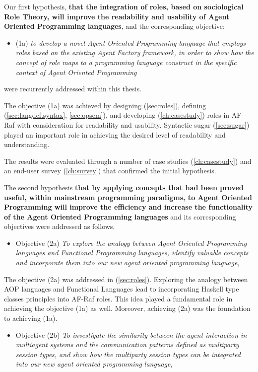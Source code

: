 \documentclass[a4paper,12pt,oneside,fleqn]{book} %
\begin{document}
{Our first hypothesis, \textbf{that the integration of roles, based on
sociological Role Theory, will improve the readability and usability of
Agent Oriented Programming languages}, and the corresponding objective:

\begin{itemize}
  \item (1a) \textit{to develop a novel Agent Oriented Programming language that employs roles based on the existing Agent Factory framework, in order to show how the concept of role maps to a programming language construct in the specific context of Agent Oriented Programming} 
\end{itemize}
were recurrently addressed within this thesis. 

The objective (1a) was achieved by designing (\autoref{sec:roles}),
defining (\autoref{sec:langdef.syntax}, \autoref{sec:opsem}), and
developing (\autoref{ch:casestudy}) roles in AF-Raf with consideration for
readability and usability. Syntactic sugar (\autoref{sec:sugar}) played an
important role in achieving the desired level of readability and
understanding.

The results were evaluated through a number of case
studies (\autoref{ch:casestudy}) and an end-user
survey (\autoref{ch:survey}) that confirmed the initial hypothesis.

The second hypothesis \textbf{that by applying concepts
that had been proved useful, within mainstream programming paradigms, to
Agent Oriented Programming will improve the efficiency and increase
the functionality of the Agent Oriented Programming languages} and its
corresponding objectives were addressed as follows.

\begin{itemize}
  \item Objective (2a) \textit{To explore the analogy between Agent
    Oriented Programming languages and Functional Programming languages,
    identify valuable concepts and incorporate them into our new agent
  oriented programming language}, 
\end{itemize}
  
The objective (2a) was addressed in (\autoref{sec:roles}). Exploring the
analogy between AOP languages and Functional Languages lead to
incorporating Haskell type classes principles into AF-Raf roles. This idea
played a fundamental role in achieving the objective (1a) as well. Moreover,
achieving (2a) was the foundation to achieving (1a).

\begin{itemize}
\item Objective (2b) \textit{To investigate the similarity between
    the agent interaction in multiagent systems and the communication
    patterns defined as multiparty session types, and show how the
    multiparty session types can be integrated into our new agent oriented
  programming language},
\end{itemize}
  
}
\end{document}
